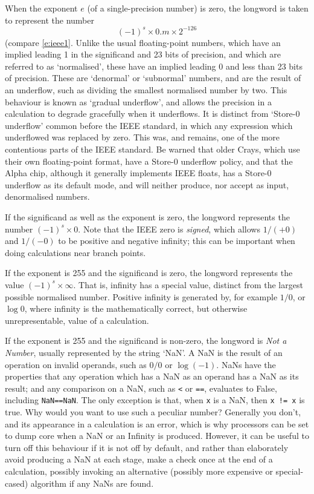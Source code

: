 \documentclass[11pt,oneside,chapters]{starlink}
\begin{document}
When the exponent $e$ (of a single-precision number) is zero,
the longword is taken to represent the number
\begin{equation}
(-1)^s \times 0.m \times 2^{-126}
\label{e:ieeedenorm}
\end{equation}
(compare \ref{e:ieee1}.
Unlike the usual floating-point numbers, which have an implied leading
1 in the significand and 23 bits of precision, and which are referred
to as `normalised', these have an implied leading 0 and less than 23
bits of precision.  These are `denormal' or `subnormal' numbers, and
are the result of an underflow, such as dividing the smallest
normalised number by two.  This behaviour is known as `gradual
underflow', and allows the precision in a calculation to degrade
gracefully when it underflows.  It is distinct from `Store-0
underflow' common before the IEEE standard, in which any expression
which underflowed was replaced by zero.  This was, and remains, one of
the more contentious parts of the IEEE standard.  Be warned that older
Crays, which use their own floating-point format, have a Store-0
underflow policy, and that the Alpha chip, although it generally
implements IEEE floats, has a Store-0 underflow as its default mode,
and will neither produce, nor accept as input, denormalised numbers.

If the significand as well as the exponent is zero, the longword
represents the number $(-1)^s \times 0$.  Note that the IEEE zero
is \emph{signed}, which allows $1/(+0)$ and $1/(-0)$ to be
positive and negative infinity; this can be important when doing
calculations near branch points.

If the exponent is 255 and the significand is zero, the longword
represents the value $(-1)^s \times \infty$.  That is, infinity has a
special value, distinct from the largest possible normalised number.
Positive infinity is generated by, for example $1/0$, or $\log 0$,
where infinity is the mathematically correct, but otherwise
unrepresentable, value of a calculation.

If the exponent is 255 and the significand is non-zero, the
longword is \emph{Not a Number}, usually represented by the string
`NaN'.  A NaN is the result of an operation on invalid operands, such
as $0/0$ or $\log(-1)$.  NaNs have the properties that any
operation which has a NaN as an operand has a NaN as its result; and
any comparison on a NaN, such as \texttt{<} or \texttt{==},
evaluates to False, including \texttt{NaN==NaN}.  The only exception
is that, when \texttt{x} is a NaN, then \texttt{x != x} is
true.  Why would you
want to use such a peculiar number?  Generally you don't, and its
appearance in a calculation is an error, which is why processors can
be set to dump core when a NaN or an Infinity is produced.  However,
it can be useful to turn off this behaviour if it is not off by
default, and rather than elaborately avoid producing a NaN at each
stage, make a check once at the end of a calculation, possibly
invoking an alternative (possibly more expensive or special-cased)
algorithm if any NaNs are found.
\end{document}
